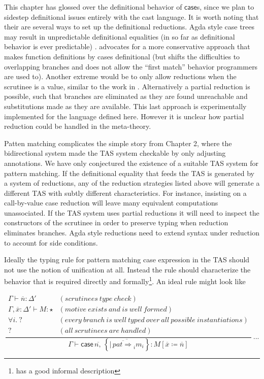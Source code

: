This chapter has glossed over the definitional behavior of $\mathsf{case}$s,
since we plan to sidestep definitional issues entirely with the cast
language. It is worth noting that their are several ways to set up
the definitional reductions. Agda style case trees may result in unpredictable
definitional equalities (in so far as definitional behavior is ever
predictable) \cite{10.1007/978-3-642-54833-8_6} . \cite{10.1007/978-3-642-54833-8_6}
advocates for a more conservative approach that makes function definitions
by cases definitional (but shifts the difficulties to overlapping
branches and does not allow the ``first match'' behavior programmers
are used to). Another extreme would be to only allow reductions when
the scrutinee is a value, similar to the work in \cite{sjoberg2012irrelevance}.
Alternatively a partial reduction is possible, such that branches
are eliminated as they are found unreachable and substitutions made
as they are available. This last approach is experimentally implemented
for the language defined here. However it is unclear how partial reduction
could be handled in the meta-theory.

Patten matching complicates the simple story from Chapter 2, where
the bidirectional system made the TAS system checkable by only adjusting
annotations. We have only conjectured the existence of a suitable
TAS system for pattern matching. If the definitional equality that
feeds the TAS is generated by a system of reductions, any of the reduction
strategies listed above will generate a different TAS with subtly
different characteristics. For instance, insisting on a call-by-value
case reduction will leave many equivalent computations unassociated.
If the TAS system uses partial reductions it will need to inspect
the constructors of the scrutinee in order to preserve typing when
reduction eliminates branches. Agda style reductions need to extend
syntax under reduction to account for side conditions. 


Ideally the typing rule for pattern matching case expression in the
TAS should not use the notion of unification at all. Instead the rule
should characterize the behavior that is required directly and formally\footnote{\cite{coquand1992pattern} has a good informal description}.
An ideal rule might look like

\[
\frac{\begin{array}{cl}
\Gamma\vdash\overline{n}:\Delta' & (scrutinees\ type\ check)\\
\Gamma,\overline{x}:\Delta'\vdash M:\star & (motive\ exists\ and\ is\ well\ formed)\\
\forall i.\:? & (every\ branch\ is\ well\ typed\ over\ all\ possible\ instantiations)\\
? & (all\ scrutinees\ are\ handled)
\end{array}}{\Gamma\vdash\mathsf{case}\,\overline{n,}\,\left\{ \overline{|\,\overline{pat\Rightarrow}_{i}m_{i}}\right\} :M\left[\overline{x}\coloneqq\overline{n}\right]}\,...
\]

